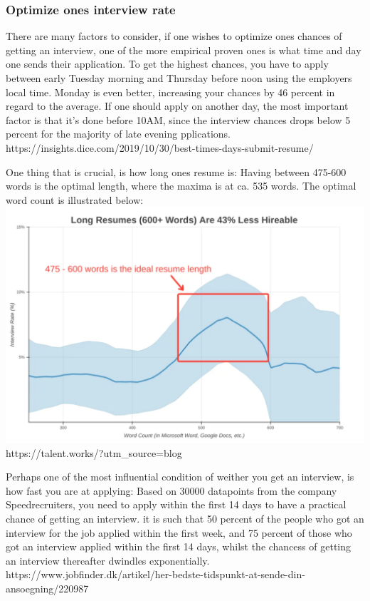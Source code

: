 \subsubsection{Optimize ones interview rate}
There are many factors to consider, if one wishes to optimize ones
chances of getting an interview, one of the more empirical proven ones
is what time and day one sends their application.
To get the highest chances, you have to apply between early Tuesday morning
and Thursday before noon using the employers local time. Monday is even better,
increasing your chances by 46 percent in regard to the average.
If one should apply on another day, the most important factor is that
it's done before 10AM, since the interview chances drops below 5 percent for
the majority of late evening pplications.
https://insights.dice.com/2019/10/30/best-times-days-submit-resume/

One thing that is crucial, is how long ones resume is:
Having between 475-600 words is the optimal length, where the maxima is at
ca. 535 words. The optimal word count is illustrated below:
\includegraphics{figures/longresumegraph.png}
https://talent.works/?utm_source=blog

Perhaps one of the most influential condition of weither you get an interview,
is how fast you are at applying:
Based on 30000 datapoints from the company Speedrecruiters, you need
to apply within the first 14 days to have a practical chance of getting an
interview. it is such that 50 percent of the people who got an interview
for the job applied within the first week, and 75 percent of those who
got an interview applied within the first 14 days, whilst the chancess of
getting an interview thereafter dwindles exponentially.
https://www.jobfinder.dk/artikel/her-bedste-tidspunkt-at-sende-din-ansoegning/220987

